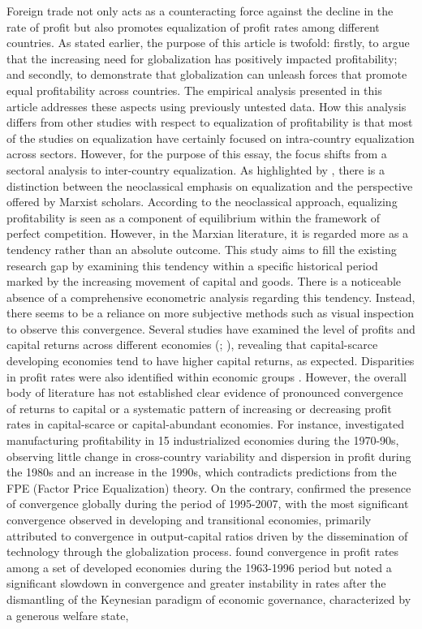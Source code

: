 \documentclass[10pt]{article}
\begin{document}
\par Foreign trade not only acts as a counteracting force against the decline in the rate of profit but also promotes equalization of profit rates among different countries. As stated earlier, the purpose of this article is twofold: firstly, to argue that the increasing need for globalization has positively impacted profitability; and secondly, to demonstrate that globalization can unleash forces that promote equal profitability across countries. The empirical analysis presented in this article addresses these aspects using previously untested data. How this analysis differs from other studies with respect to equalization of profitability is that most of the studies on equalization have certainly focused on intra-country equalization across sectors. However, for the purpose of this essay, the focus shifts from a sectoral analysis to inter-country equalization. As highlighted by \citet{ChouIzyumovVahaly2015}, there is a distinction between the neoclassical emphasis on equalization and the perspective offered by Marxist scholars. According to the neoclassical approach, equalizing profitability is seen as a component of equilibrium within the framework of perfect competition. However, in the Marxian literature, it is regarded more as a tendency rather than an absolute outcome. This study aims to fill the existing research gap by examining this tendency within a specific historical period marked by the increasing movement of capital and goods. There is a noticeable absence of a comprehensive econometric analysis regarding this tendency. Instead, there seems to be a reliance on more subjective methods such as visual inspection to observe this convergence. Several studies have examined the level of profits and capital returns across different economies (\citet{bigsten2000rates}; \citet{udry2006return}), revealing that capital-scarce developing economies tend to have higher capital returns, as expected. Disparities in profit rates were also identified within economic groups \citep{harberger1978distributional}. However, the overall body of literature has not established clear evidence of pronounced convergence of returns to capital or a systematic pattern of increasing or decreasing profit rates in capital-scarce or capital-abundant economies. For instance, \citet{Glyn2004} investigated manufacturing profitability in 15 industrialized economies during the 1970-90s, observing little change in cross-country variability and dispersion in profit during the 1980s and an increase in the 1990s, which contradicts predictions from the FPE (Factor Price Equalization) theory. On the contrary, \citet{ChouIzyumovVahaly2015} confirmed the presence of convergence globally during the period of 1995-2007, with the most significant convergence observed in developing and transitional economies, primarily attributed to convergence in output-capital ratios driven by the dissemination of technology through the globalization process. \citet{Carter2004} found convergence in profit rates among a set of developed economies during the 1963-1996 period but noted a significant slowdown in convergence and greater instability in rates after the dismantling of the Keynesian paradigm of economic governance, characterized by a generous welfare state, 
\end{document}

